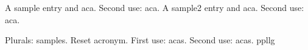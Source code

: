 \documentclass{article}
\begin{document}
A \gls{sample} entry and \gls{aca}. Second use: \gls{aca}.
A \gls{sample2} entry and \gls{aca}. Second use: \gls{aca}.

Plurals: \glspl{sample}. Reset acronym.
First use: \glspl{aca}. Second use: \glspl{aca}.
\gls{ppllg}

\printglossaries
\end{document}
